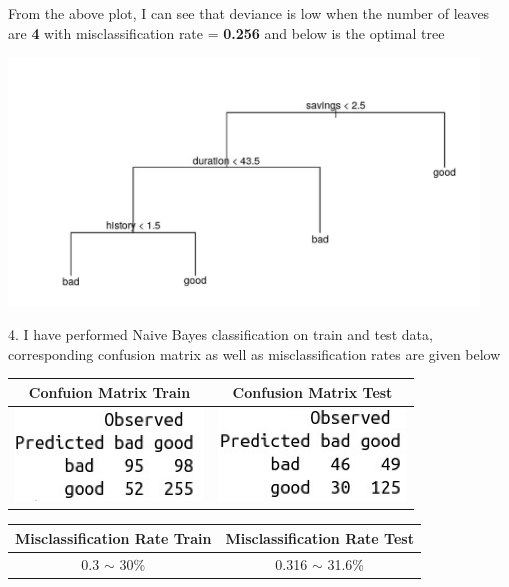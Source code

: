 \documentclass[a4paper,10pt]{article}
\begin{document}
From the above plot, I can see that deviance is low when the number of leaves are \textbf{4} with misclassification rate = \textbf{0.256} and below is the optimal tree \par
\begin{center}
  \includegraphics[width=125mm,scale=0.10]{Optimal_Tree_After_Pruning.png} 
\end{center} \par
\vspace{0.5cm}
4. I have performed Naive Bayes classification on train and test data, corresponding confusion matrix as well as misclassification rates are given below \par
\begin{center}
  \begin{tabular}{|c|c|}
    \hline
    \textbf{Confuion Matrix Train} & \textbf{Confusion Matrix Test} \\
    \hline
    \includegraphics[width=50mm,scale=0.10]{Naive_Bayes_Train_CM.png} & \includegraphics[width=50mm,scale=0.10]{Naive_Bayes_Test_CM.png} \\
    \hline
  \end{tabular} \par
  \begin{tabular}{|c|c|}
    \hline
    \textbf{Misclassification Rate Train} & \textbf{Misclassification Rate Test} \\
    \hline
    0.3 $\sim$ 30\% & 0.316 $\sim$ 31.6\% \\
    \hline
  \end{tabular}
\end{center}
\end{document}
